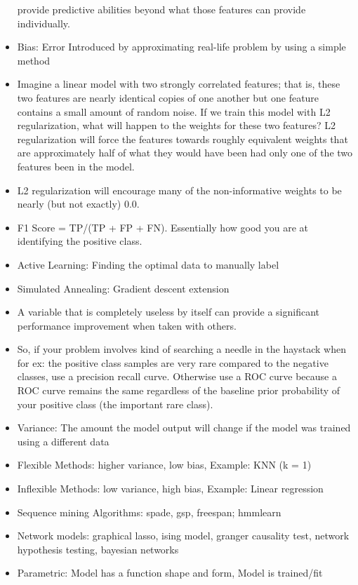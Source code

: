 \documentclass[]{book}
\theoremstyle{definition}
\theoremstyle{definition}
\theoremstyle{definition}
\theoremstyle{remark}
\begin{document}
\begin{itemize}
  provide predictive abilities beyond what those features can provide
  individually.
\item
  Bias: Error Introduced by approximating real-life problem by using a
  simple method
\item
  Imagine a linear model with two strongly correlated features; that is,
  these two features are nearly identical copies of one another but one
  feature contains a small amount of random noise. If we train this
  model with L2 regularization, what will happen to the weights for
  these two features? L2 regularization will force the features towards
  roughly equivalent weights that are approximately half of what they
  would have been had only one of the two features been in the model.
\item
  L2 regularization will encourage many of the non-informative weights
  to be nearly (but not exactly) 0.0.
\item
  F1 Score = TP/(TP + FP + FN). Essentially how good you are at
  identifying the positive class.
\item
  Active Learning: Finding the optimal data to manually label
\item
  Simulated Annealing: Gradient descent extension
\item
  A variable that is completely useless by itself can provide a
  significant performance improvement when taken with others.
\item
  So, if your problem involves kind of searching a needle in the
  haystack when for ex: the positive class samples are very rare
  compared to the negative classes, use a precision recall curve.
  Otherwise use a ROC curve because a ROC curve remains the same
  regardless of the baseline prior probability of your positive class
  (the important rare class).
\item
  Variance: The amount the model output will change if the model was
  trained using a different data
\item
  Flexible Methods: higher variance, low bias, Example: KNN (k = 1)
\item
  Inflexible Methods: low variance, high bias, Example: Linear
  regression
\item
  Sequence mining Algorithms: spade, gsp, freespan; hmmlearn
\item
  Network models: graphical lasso, ising model, granger causality test,
  network hypothesis testing, bayesian networks
\item
  Parametric: Model has a function shape and form, Model is trained/fit

\end{itemize}
\end{document}
